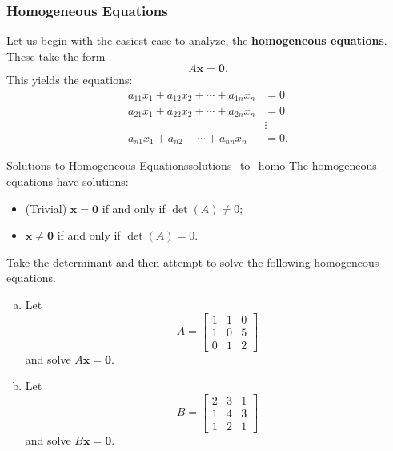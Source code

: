         \subsubsection{Homogeneous Equations}
        Let us begin with the easiest case to analyze, the \textbf{homogeneous equations}. These take the form 
        \[
        A\mathbf{x}=\mathbf{0}.
        \]
        This yields the equations:
        \begin{align*}
            a_{11}x_1 + a_{12}x_2 + \cdots + a_{1n}x_n &=0\\
            a_{21}x_1 + a_{22} x_2 + \cdots + a_{2n}x_n &=0\\
            &\vdots\\
            a_{n1}x_1 +a_{n2}+ \cdots +a_{nn}x_n &=0.
        \end{align*}
        
        \begin{prop}{Solutions to Homogeneous Equations}{solutions_to_homo}
        The homogeneous equations have solutions:
        \begin{itemize}
            \item (Trivial) $\mathbf{x}=\mathbf{0}$ if and only if $\det(A)\neq 0$;
            \item $\mathbf{x}\neq \mathbf{0}$ if and only if $\det(A)= 0$.
        \end{itemize}
        \end{prop}
        
        \begin{exercise}
        Take the determinant and then attempt to solve the following homogeneous equations.
        \begin{enumerate}[(a)]
            \item Let 
            \[
            A=\begin{bmatrix}
            1 & 1 & 0\\
            1 & 0 & 5\\
            0 & 1 & 2
            \end{bmatrix}
            \]
            and solve $A\mathbf{x}=\mathbf{0}.$
            \item Let
            \[
            B=\begin{bmatrix}
            2 & 3 & 1\\
            1 & 4 & 3\\
            1 & 2 & 1
            \end{bmatrix}
            \]
            and solve $B\mathbf{x}=\mathbf{0}.$
        \end{enumerate}
        \end{exercise}
        
